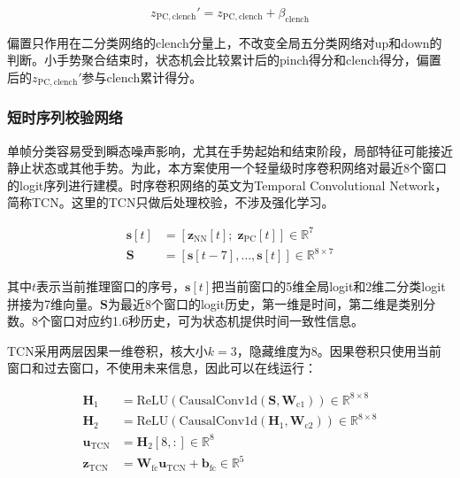 \documentclass[lettersize,journal]{IEEEtran}
\begin{document}
\begin{equation}
    z_\mathrm{PC,clench}' = z_\mathrm{PC,clench} + \beta_\mathrm{clench}
\end{equation}

偏置只作用在二分类网络的clench分量上，不改变全局五分类网络对up和down的判断。小手势聚合结束时，状态机会比较累计后的pinch得分和clench得分，偏置后的$z_\mathrm{PC,clench}'$参与clench累计得分。

\subsubsection{短时序列校验网络}

单帧分类容易受到瞬态噪声影响，尤其在手势起始和结束阶段，局部特征可能接近静止状态或其他手势。为此，本方案使用一个轻量级时序卷积网络对最近8个窗口的logit序列进行建模\cite{bai2018empirical}。时序卷积网络的英文为Temporal Convolutional Network，简称TCN。这里的TCN只做后处理校验，不涉及强化学习。

\begin{equation}
    \begin{aligned}
        \mathbf{s}[t] &= [\mathbf{z}_\mathrm{NN}[t];\; \mathbf{z}_\mathrm{PC}[t]] \in \mathbb{R}^{7} \\
        \mathbf{S} &= [\mathbf{s}[t-7], \ldots, \mathbf{s}[t]] \in \mathbb{R}^{8 \times 7}
    \end{aligned}
\end{equation}

其中$t$表示当前推理窗口的序号，$\mathbf{s}[t]$把当前窗口的5维全局logit和2维二分类logit拼接为7维向量。$\mathbf{S}$为最近8个窗口的logit历史，第一维是时间，第二维是类别分数。8个窗口对应约1.6秒历史，可为状态机提供时间一致性信息。

TCN采用两层因果一维卷积，核大小$k=3$，隐藏维度为8。因果卷积只使用当前窗口和过去窗口，不使用未来信息，因此可以在线运行：

\begin{equation}
    \begin{aligned}
        \mathbf{H}_1 &= \mathrm{ReLU}(\mathrm{CausalConv1d}(\mathbf{S}, \mathbf{W}_\mathrm{c1})) \in \mathbb{R}^{8 \times 8} \\
        \mathbf{H}_2 &= \mathrm{ReLU}(\mathrm{CausalConv1d}(\mathbf{H}_1, \mathbf{W}_\mathrm{c2})) \in \mathbb{R}^{8 \times 8} \\
        \mathbf{u}_\mathrm{TCN} &= \mathbf{H}_2[8,:] \in \mathbb{R}^{8} \\
        \mathbf{z}_\mathrm{TCN} &= \mathbf{W}_\mathrm{fc} \mathbf{u}_\mathrm{TCN} + \mathbf{b}_\mathrm{fc} \in \mathbb{R}^{5}
    \end{aligned}
\end{equation}
\end{document}
